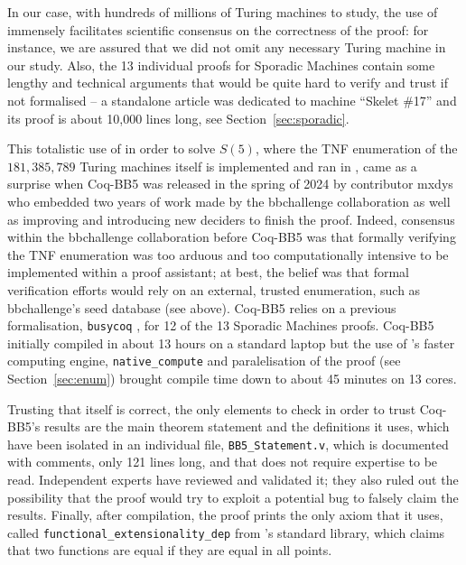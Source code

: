 \documentclass[a4paper,british]{article}
\theoremstyle{definition} %
\numberwithin{equation}{section}
\theoremstyle{definition} %
\newcommand{\BBtheFifthTNF}{181{,}385{,}789}
\newcommand{\CoqBB}{Coq-BB5\xspace}
\begin{document}
In our case, with hundreds of millions of Turing machines to study, the use of \Coq immensely facilitates scientific consensus on the correctness of the proof: for instance, we are assured that we did not omit any necessary Turing machine in our study. Also, the 13 individual proofs for Sporadic Machines contain some lengthy and technical arguments that would be quite hard to verify and trust if not formalised -- \eg a standalone article was dedicated to machine ``Skelet \#17'' \cite{xu2024skelet17fifthbusy} and its \Coq proof is about 10,000 lines long, see Section~\ref{sec:sporadic}.

This totalistic use of \Coq in order to solve $S(5)$, where the TNF enumeration of the $\BBtheFifthTNF$ Turing machines itself is implemented and ran in \Coq, came as a surprise when \CoqBB was released in the spring of 2024 by contributor mxdys who embedded two years of work made by the bbchallenge collaboration as well as improving and introducing new deciders to finish the proof. Indeed, consensus within the bbchallenge collaboration before \CoqBB was that formally verifying the TNF enumeration was too arduous and too computationally intensive to be implemented within a proof assistant; at best, the belief was that formal verification efforts would rely on an external, trusted enumeration, such as bbchallenge's seed database (see above). \CoqBB relies on a previous formalisation, \texttt{busycoq} \cite{busycoq}, for 12 of the 13 Sporadic Machines \Coq proofs. \CoqBB initially compiled in about 13 hours on a standard laptop but the use of \Coq's faster computing engine, \texttt{native\_compute} \cite{nativecompute} and paralelisation of the proof (see Section~\ref{sec:enum}) brought compile time down to about 45 minutes on 13 cores.

Trusting that \Coq itself is correct, the only elements to check in order to trust \CoqBB's results are the main theorem statement and the definitions it uses, which have been isolated in an individual file, \texttt{BB5\_Statement.v}, which is documented with comments, only 121 lines long, and that does not require \Coq expertise to be read. Independent \Coq experts have reviewed and validated it; they also ruled out the possibility that the proof would try to exploit a potential \Coq bug to falsely claim the results. Finally, after compilation, the proof prints the only axiom that it uses, called \texttt{functional\_extensionality\_dep} from \Coq's standard library, which claims that two functions are equal if they are equal in all points.
\end{document}
